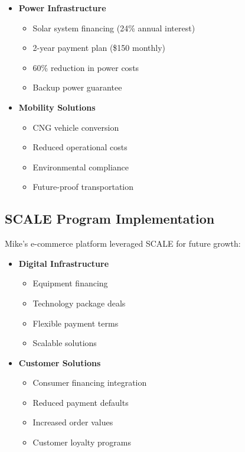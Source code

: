 \begin{itemize}
    \item \textbf{Power Infrastructure}
    \begin{itemize}
        \item Solar system financing (24\% annual interest)
        \item 2-year payment plan (\$150 monthly)
        \item 60\% reduction in power costs
        \item Backup power guarantee
    \end{itemize}

    \item \textbf{Mobility Solutions}
    \begin{itemize}
        \item CNG vehicle conversion
        \item Reduced operational costs
        \item Environmental compliance
        \item Future-proof transportation
    \end{itemize}
\end{itemize}

\subsection{SCALE Program Implementation}\label{subsec:scale-implementation}

Mike's e-commerce platform leveraged SCALE for future growth:

\begin{itemize}
    \item \textbf{Digital Infrastructure}
    \begin{itemize}
        \item Equipment financing
        \item Technology package deals
        \item Flexible payment terms
        \item Scalable solutions
    \end{itemize}

    \item \textbf{Customer Solutions}
    \begin{itemize}
        \item Consumer financing integration
        \item Reduced payment defaults
        \item Increased order values
        \item Customer loyalty programs
    \end{itemize}
\end{itemize}

